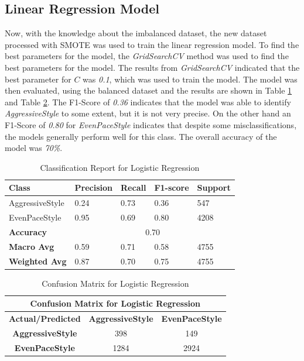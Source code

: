\documentclass[10pt,journal,compsoc]{IEEEtran}
\begin{document}
\subsection{Linear Regression Model}
Now, with the knowledge about the imbalanced dataset, the new dataset processed with SMOTE was used to train the linear regression model. To find the best parameters for the model,
the \textit{GridSearchCV} method was used to find the best parameters for the model. The results from \textit{GridSearchCV} indicated that the best parameter for $C$ was \textit{0.1},
which was used to train the model. The model was then evaluated, using the balanced dataset and the results are shown in Table \ref{table:log_classification_report} 
and Table \ref{table:log_confusion_matrix}. The F1-Score of \textit{0.36} indicates that the model was able to identify \textit{AggressiveStyle} to some extent, but it is not very precise. On the other hand an F1-Score of \textit{0.80} 
for \textit{EvenPaceStyle} indicates that despite some misclassifications, the models generally perform well for this class. The overall accuracy of the model was \textit{70\%}.


\begin{table}[h]
    \centering    
    \begin{tabular}{|l|l|l|l|l|}
    \hline
    \textbf{Class} & \textbf{Precision} & \textbf{Recall} & \textbf{F1-score} & \textbf{Support} \\ \hline
    AggressiveStyle & 0.24 & 0.73 & 0.36 & 547 \\ \hline
    EvenPaceStyle & 0.95 & 0.69 & 0.80 & 4208 \\ \hline
    \textbf{Accuracy} & \multicolumn{4}{c|}{0.70} \\ \hline
    \textbf{Macro Avg} & 0.59 & 0.71 & 0.58 & 4755 \\ \hline
    \textbf{Weighted Avg} & 0.87 & 0.70 & 0.75 & 4755 \\ \hline
    \end{tabular}
    \caption{Classification Report for Logistic Regression}
    \label{table:log_classification_report}
\end{table}

\begin{table}[h]
    \centering
    \begin{tabular}{|c|c|c|}
    \hline
    \multicolumn{3}{|c|}{\textbf{Confusion Matrix for Logistic Regression}} \\
    \hline
    \textbf{Actual/Predicted} & \textbf{AggressiveStyle} & \textbf{EvenPaceStyle} \\ \hline
    \textbf{AggressiveStyle} & 398 & 149 \\ \hline
    \textbf{EvenPaceStyle} & 1284 & 2924 \\ \hline
    \end{tabular}
    \caption{Confusion Matrix for Logistic Regression}
    \label{table:log_confusion_matrix}
\end{table}
\end{document}

